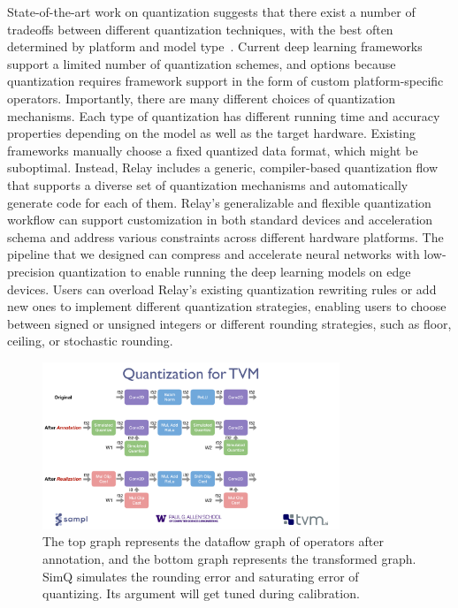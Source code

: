 State-of-the-art work on quantization suggests that there exist a number of tradeoffs
  between different quantization techniques,
  with the best often determined by platform and model type~\citep{krishnamoorthi18}.
Current deep learning frameworks support a limited number of quantization schemes, and options
  because quantization requires framework support in the form of custom platform-specific operators.
Importantly, there are many different choices of quantization mechanisms.
Each type of quantization has different running time and accuracy properties depending
  on the model as well as the target hardware.
Existing frameworks manually choose a fixed quantized data format, which might be
  suboptimal.
Instead, Relay includes a generic, compiler-based quantization flow that supports a diverse set
  of quantization mechanisms and automatically generate code for each of them.
Relay's generalizable and flexible quantization workflow
  can support customization in both standard devices and acceleration schema
  and address various constraints across different hardware platforms.
The pipeline that we designed can compress and accelerate neural networks with
  low-precision quantization to enable running the deep learning models on edge devices.
Users can overload Relay's existing quantization rewriting rules or add new ones
  to implement different quantization strategies, enabling users to choose between
  signed or unsigned integers or different rounding strategies, such as
  floor, ceiling, or stochastic rounding.

\begin{figure}[h]
  \includegraphics[height=5cm]{fig_splash19/quantization/quant_pdf.pdf}
  \caption{The top graph represents the dataflow graph of operators after annotation,
  and the bottom graph represents the transformed graph.
  SimQ simulates the rounding error and saturating error of quantizing.
  Its argument will get tuned during calibration.}
  \label{fig:quant_flow}
\end{figure}

